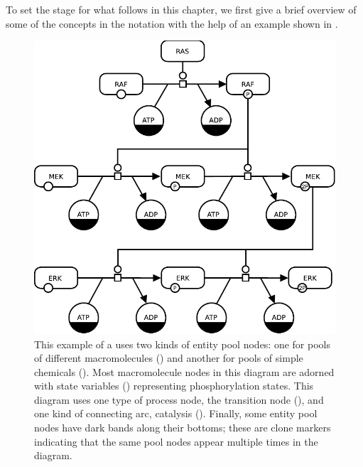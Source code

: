 
To set the stage for what follows in this chapter, we first give a brief overview of some of the concepts in the \PD notation with the help of an example shown in .

\begin{figure}[H]
  \centering
  \vspace*{-0.75em}
  \includegraphics[scale=0.8]{examples/MAPK-only}
  \caption{This example of a \PD uses two kinds of entity pool nodes: one
    for pools of different macromolecules () and
    another for pools of simple chemicals ().  Most
    macromolecule nodes in this diagram are adorned with state
    variables () representing phosphorylation states.
    This diagram uses one type of process node, the transition node
    (), and one kind of connecting arc, catalysis
    ().  Finally, some entity pool nodes have dark bands
    along their bottoms; these are clone markers indicating that the same
    pool nodes appear multiple times in the diagram.}
  \label{fig:eg1}
\end{figure}

